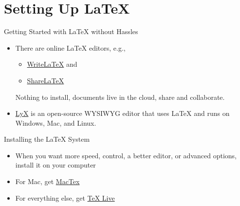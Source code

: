 \section{Setting Up \LaTeX}


\begin{frame}{Getting Started with \LaTeX{} without Hassles}

\begin{itemize}
\item There are online \LaTeX{} editors, e.g.,
\begin{itemize}
\item \href{https://www.writelatex.com/}{WriteLaTeX} and 
\item \href{https://www.sharelatex.com/}{ShareLaTeX}
\end{itemize}
Nothing to install, documents live in the cloud, share and collaborate.
\item \href{http://www.lyx.org/}{LyX} is an open-source WYSIWYG editor
  that uses \LaTeX{} and runs on Windows, Mac, and Linux.
\end{itemize}

\end{frame}

\begin{frame}{Installing the \LaTeX{} System}

\begin{itemize}
\item When you want more speed, control, a better editor, or advanced 
options, install it on your computer
\item For Mac, get \href{http://www.tug.org/mactex/}{MacTex}
\item For everything else, get \href{http://www.tug.org/texlive/}{TeX Live}
\end{itemize}

\end{frame}

